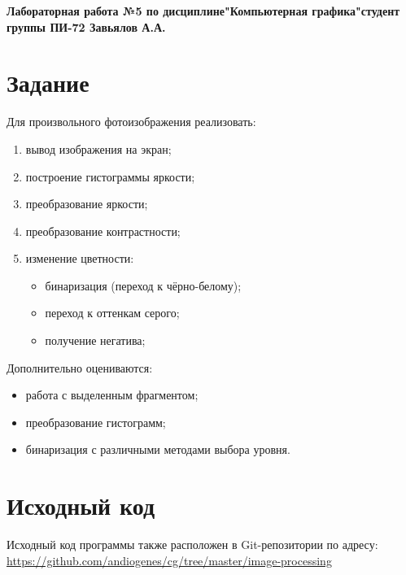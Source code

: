 \documentclass[a4paper,12pt]{article}
\begin{document}

\begin{center}
  \textbf{Лабораторная работа №5 по дисциплине\linebreak"Компьютерная графика"\linebreak{} студент группы ПИ-72 Завьялов А.А.}\\
\end{center}

\section{\normalsize{Задание}}
\begin{flushleft}
Для произвольного фотоизображения реализовать:

\begin{enumerate}
    \item вывод изображения на экран;
    \item построение гистограммы яркости;
    \item преобразование яркости;
    \item преобразование контрастности;
    \item изменение цветности: \begin{itemize}
        \item бинаризация (переход к чёрно-белому);
        \item переход к оттенкам серого;
        \item получение негатива;
    \end{itemize}
\end{enumerate}

Дополнительно оцениваются:

\begin{itemize}
    \item работа с выделенным фрагментом;
    \item преобразование гистограмм;
    \item бинаризация с различными методами выбора уровня.
\end{itemize}

\end{flushleft}

\section{\normalsize{Исходный код}}
Исходный код программы также расположен в Git-репозитории по адресу: \url{https://github.com/andiogenes/cg/tree/master/image-processing}
\inputminted[breaklines]{py}{../simplest.py}
\end{document}
